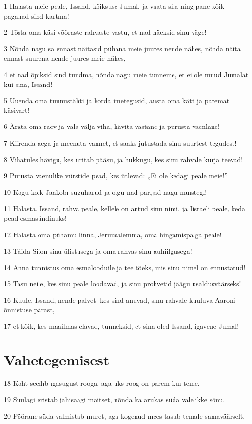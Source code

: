 \par 1 Halasta meie peale, Issand, kõiksuse Jumal, ja vaata siia ning pane kõik paganad sind kartma!
\par 2 Tõsta oma käsi võõraste rahvaste vastu, et nad näeksid sinu väge!
\par 3 Nõnda nagu sa ennast näitasid pühana meie juures nende nähes, nõnda näita ennast suurena nende juures meie nähes,
\par 4 et nad õpiksid sind tundma, nõnda nagu meie tunneme, et ei ole muud Jumalat kui sina, Issand!
\par 5 Uuenda oma tunnustähti ja korda imetegusid, austa oma kätt ja paremat käsivart!
\par 6 Ärata oma raev ja vala välja viha, hävita vastane ja purusta vaenlane!
\par 7 Kiirenda aega ja meenuta vannet, et saaks jutustada sinu suurtest tegudest!
\par 8 Vihatules hävigu, kes üritab pääsu, ja hukkugu, kes sinu rahvale kurja teevad!
\par 9 Purusta vaenulike vürstide pead, kes ütlevad: „Ei ole kedagi peale meie!”
\par 10 Kogu kõik Jaakobi suguharud ja olgu nad pärijad nagu muistegi!
\par 11 Halasta, Issand, rahva peale, kellele on antud sinu nimi, ja Iisraeli peale, keda pead esmasündinuks!
\par 12 Halasta oma pühamu linna, Jeruusalemma, oma hingamispaiga peale!
\par 13 Täida Siion sinu ülistusega ja oma rahvas sinu auhiilgusega!
\par 14 Anna tunnistus oma esmalooduile ja tee tõeks, mis sinu nimel on ennustatud!
\par 15 Tasu neile, kes sinu peale loodavad, ja sinu prohvetid jäägu usaldusväärseks!
\par 16 Kuule, Issand, nende palvet, kes sind anuvad, sinu rahvale kuuluva Aaroni õnnistuse pärast,
\par 17 et kõik, kes maailmas elavad, tunneksid, et sina oled Issand, igavene Jumal!

\section*{Vahetegemisest}

\par 18 Kõht seedib igasugust rooga, aga üks roog on parem kui teine.
\par 19 Suulagi eristab jahisaagi maitset, nõnda ka arukas süda valelikke sõnu.
\par 20 Pöörane süda valmistab muret, aga kogenud mees tasub temale samaväärselt.

